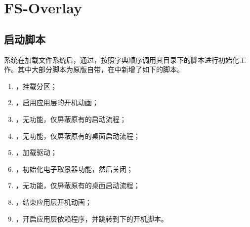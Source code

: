 \documentclass[UTF8]{ctexart}
\begin{document}
\newpage

\section{FS-Overlay}

\subsection{启动脚本}

系统在加载文件系统后，通过，按照字典顺序调用其目录下的脚本进行初始化工作。其中大部分脚本为原版自带，在中新增了如下的脚本。

\begin{enumerate}
    \item {}，挂载分区；
    \item {}，启用应用层的开机动画；
    \item {}，无功能，仅屏蔽原有的启动流程；
    \item {}，无功能，仅屏蔽原有的桌面启动流程；
    \item {}，加载驱动；
    \item {}，初始化电子取景器功能，然后关闭；
    \item {}，无功能，仅屏蔽原有的桌面启动流程；
    \item {}，结束应用层开机动画；
    \item {}，开启应用层依赖程序，并跳转到下的开机脚本。
\end{enumerate}
\end{document}
